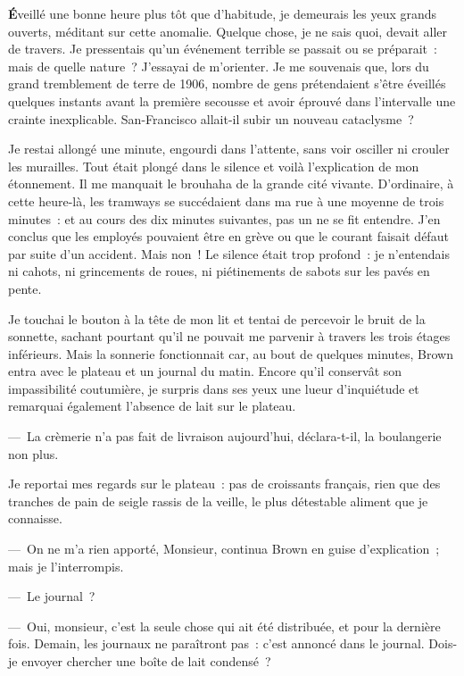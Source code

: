 \documentclass[french,twoside]{book} %
\begin{document}
  \noindent \textbf{É}veillé une bonne heure plus tôt que d’habitude, je demeurais les yeux grands ouverts, méditant sur cette anomalie. Quelque chose, je ne sais quoi, devait aller de travers. Je pressentais qu’un événement terrible se passait ou se préparait : mais de quelle nature ? J’essayai de m’orienter. Je me souvenais que, lors du grand tremblement de terre de 1906, nombre de gens prétendaient s’être éveillés quelques instants avant la première secousse et avoir éprouvé dans l’intervalle une crainte inexplicable. San-Francisco allait-il subir un nouveau cataclysme ?\par
Je restai allongé une minute, engourdi dans l’attente, sans voir osciller ni crouler les murailles. Tout était plongé dans le silence et voilà l’explication de mon étonnement. Il me manquait le brouhaha de la grande cité vivante. D’ordinaire, à cette heure-là, les tramways se succédaient dans ma rue à une moyenne de trois minutes : et au cours des dix minutes suivantes, pas un ne se fit entendre. J’en conclus que les employés pouvaient être en grève ou que le courant faisait défaut par suite d’un accident. Mais non ! Le silence était trop profond : je n’entendais ni cahots, ni grincements de roues, ni piétinements de sabots sur les pavés en pente.\par
Je touchai le bouton à la tête de mon lit et tentai de percevoir le bruit de la sonnette, sachant pourtant qu’il ne pouvait me parvenir à travers les trois étages inférieurs. Mais la sonnerie fonctionnait car, au bout de quelques minutes, Brown entra avec le plateau et un journal du matin. Encore qu’il conservât son impassibilité coutumière, je surpris dans ses yeux une lueur d’inquiétude et remarquai également l’absence de lait sur le plateau.\par
— La crèmerie n’a pas fait de livraison aujourd’hui, déclara-t-il, la boulangerie non plus.\par
Je reportai mes regards sur le plateau : pas de croissants français, rien que des tranches de pain de seigle rassis de la veille, le plus détestable aliment que je connaisse.\par
— On ne m’a rien apporté, Monsieur, continua Brown en guise d’explication ; mais je l’interrompis.\par
— Le journal ?\par
— Oui, monsieur, c’est la seule chose qui ait été distribuée, et pour la dernière fois. Demain, les journaux ne paraîtront pas : c’est annoncé dans le journal. Dois-je envoyer chercher une boîte de lait condensé ?\par
\end{document}
